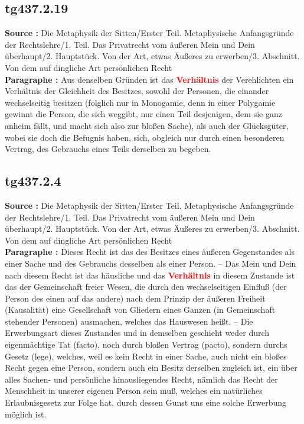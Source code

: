 \documentclass[a4paper,12pt,twoside]{book}
\newcommand{\match}[1]{\textcolor{red}{\textbf{#1}}}
\begin{document}
	\subsection*{tg437.2.19} 
	\textbf{Source : }Die Metaphysik der Sitten/Erster Teil. Metaphysische Anfangsgründe der Rechtslehre/1. Teil. Das Privatrecht vom äußeren Mein und Dein überhaupt/2. Hauptstück. Von der Art, etwas Äußeres zu erwerben/3. Abschnitt. Von dem auf dingliche Art persönlichen Recht\\  
	
	\textbf{Paragraphe : }Aus denselben Gründen ist das \match{Verhältnis} der Verehlichten ein Verhältnis der Gleichheit des Besitzes, sowohl der Personen, die einander wechselseitig besitzen (folglich nur in Monogamie, denn in einer Polygamie gewinnt die Person, die sich weggibt, nur einen Teil desjenigen, dem sie ganz anheim fällt, und macht sich also zur bloßen Sache), als auch der Glücksgüter, wobei sie doch die Befugnis haben, sich, obgleich nur durch einen besonderen Vertrag, des Gebrauchs eines Teils derselben zu begeben. 
	
	\subsection*{tg437.2.4} 
	\textbf{Source : }Die Metaphysik der Sitten/Erster Teil. Metaphysische Anfangsgründe der Rechtslehre/1. Teil. Das Privatrecht vom äußeren Mein und Dein überhaupt/2. Hauptstück. Von der Art, etwas Äußeres zu erwerben/3. Abschnitt. Von dem auf dingliche Art persönlichen Recht\\  
	
	\textbf{Paragraphe : }Dieses Recht ist das des Besitzes eines äußeren Gegenstandes als einer Sache und des Gebrauchs desselben 
	als einer Person. – Das Mein und Dein nach diesem Recht ist das häusliche und das \match{Verhältnis} in diesem Zustande ist das der Gemeinschaft freier Wesen, die durch den wechselseitigen Einfluß (der Person des einen auf das andere) nach dem Prinzip der äußeren Freiheit (Kausalität) eine Gesellschaft von Gliedern eines Ganzen (in Gemeinschaft stehender Personen) ausmachen, welches das Hauswesen heißt. – Die Erwerbungsart dieses Zustandes und in demselben geschieht weder durch eigenmächtige Tat (facto), noch durch bloßen Vertrag (pacto), sondern durchs Gesetz (lege), welches, weil es kein Recht in einer Sache, auch nicht ein bloßes Recht gegen eine Person, sondern auch ein Besitz derselben zugleich ist, ein über alles Sachen- und persönliche hinausliegendes Recht, nämlich das Recht der Menschheit in unserer eigenen Person sein muß, welches ein natürliches Erlaubnisgesetz zur Folge hat, durch dessen Gunst uns eine solche Erwerbung möglich ist. 
	
\end{document}

